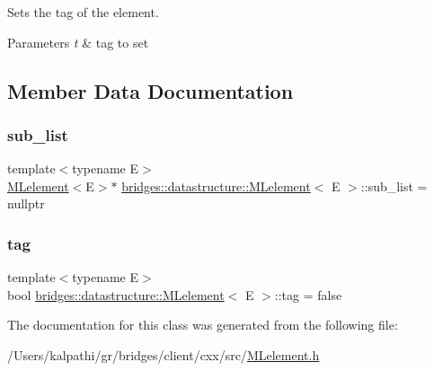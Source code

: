 Sets the tag of the element. 


\begin{DoxyParams}{Parameters}
{\em t} & tag to set \\
\hline
\end{DoxyParams}


\subsection{Member Data Documentation}
\mbox{\label{classbridges_1_1datastructure_1_1_m_lelement_afe31ff363c0861efb8eacc12f2a651df}} 
\subsubsection{\texorpdfstring{sub\+\_\+list}{sub\_list}}
{\footnotesize\ttfamily template$<$typename E$>$ \\
\mbox{\hyperlink{classbridges_1_1datastructure_1_1_m_lelement}{M\+Lelement}}$<$E$>$$\ast$ \mbox{\hyperlink{classbridges_1_1datastructure_1_1_m_lelement}{bridges\+::datastructure\+::\+M\+Lelement}}$<$ E $>$\+::sub\+\_\+list = nullptr\hspace{0.3cm}{\ttfamily [protected]}}

\mbox{\label{classbridges_1_1datastructure_1_1_m_lelement_aef061a364a85ebb0c0f2cdaff8c726e6}} 
\subsubsection{\texorpdfstring{tag}{tag}}
{\footnotesize\ttfamily template$<$typename E$>$ \\
bool \mbox{\hyperlink{classbridges_1_1datastructure_1_1_m_lelement}{bridges\+::datastructure\+::\+M\+Lelement}}$<$ E $>$\+::tag = false\hspace{0.3cm}{\ttfamily [protected]}}



The documentation for this class was generated from the following file\+:\begin{DoxyCompactItemize}
\item 
/\+Users/kalpathi/gr/bridges/client/cxx/src/\mbox{\hyperlink{_m_lelement_8h}{M\+Lelement.\+h}}\end{DoxyCompactItemize}
